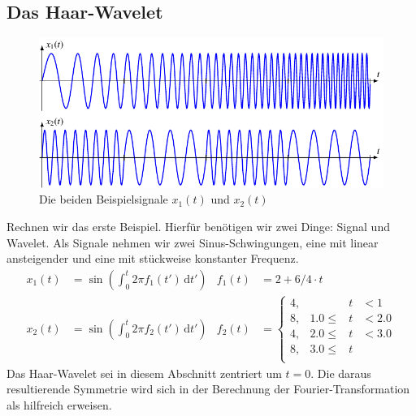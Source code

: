 \subsection{Das Haar-Wavelet}
\begin{figure}
	\centering
	\includegraphics{papers/complex/images/signals.pdf}
	\caption{Die beiden Beispielsignale $x_1(t)$ und $x_2(t)$}
\end{figure}
Rechnen wir das erste Beispiel.
Hierfür benötigen wir zwei Dinge: Signal und Wavelet.
Als Signale nehmen wir zwei Sinus-Schwingungen, eine mit linear ansteigender und eine mit stückweise konstanter Frequenz.
\begin{align}
    x_1(t) &= \sin\left( \int_{0}^{t} 2\pi f_1(t')\,\mathrm{d}t'\right) & f_1(t) &= 2 + 6/4 \cdot t \\
    x_2(t) &= \sin\left( \int_{0}^{t} 2\pi f_2(t')\,\mathrm{d}t'\right) & f_2(t) &= \left\lbrace \begin{matrix}
    4, & &t& < 1\\
    8, & 1.0 \le &t& < 2.0\\
    4, & 2.0 \le &t& < 3.0\\
    8, & 3.0 \le &t&\\
    \end{matrix}\right.
\end{align}
Das Haar-Wavelet sei in diesem Abschnitt zentriert um $t=0$.
Die daraus resultierende Symmetrie wird sich in der Berechnung der Fourier-Transformation als hilfreich erweisen.

